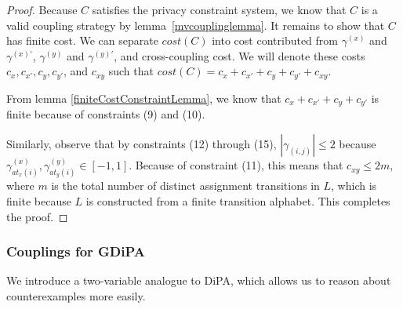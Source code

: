 \begin{proof}
    Because $C$ satisfies the privacy constraint system, we know that $C$ is a valid coupling strategy by lemma~\ref{mvcouplinglemma}. It remains to show that $C$ has finite cost. We can separate $cost(C)$ into cost contributed from $\gamma^{(x)}$ and $\gamma^{(x)\prime}$, $\gamma^{(y)}$ and $\gamma^{(y)\prime}$, and cross-coupling cost. We will denote these costs $c_x, c_{x\prime}, c_y, c_{y\prime}$, and $c_{xy}$ such that $cost(C) = c_x + c_{x\prime}+c_y+c_{y\prime}+c_{xy}$.

    From lemma \ref{finiteCostConstraintLemma}, we know that $c_x + c_{x\prime}+c_y+c_{y\prime}$ is finite because of constraints (9) and (10). 

    Similarly, observe that by constraints (12) through (15), $|\gamma_{(i, j)}|\leq 2$ because $\gamma_{at_x(i)}^{(x)},\gamma_{at_y(i)}^{(y)}\in [-1, 1]$. Because of constraint (11), this means that $c_{xy}\leq 2m$, where $m$ is the total number of distinct assignment transitions in $L$, which is finite because $L$ is constructed from a finite transition alphabet. This completes the proof.
\end{proof}


\subsubsection{Couplings for GDiPA}

We introduce a two-variable analogue to DiPA, which allows us to reason about counterexamples more easily. 

